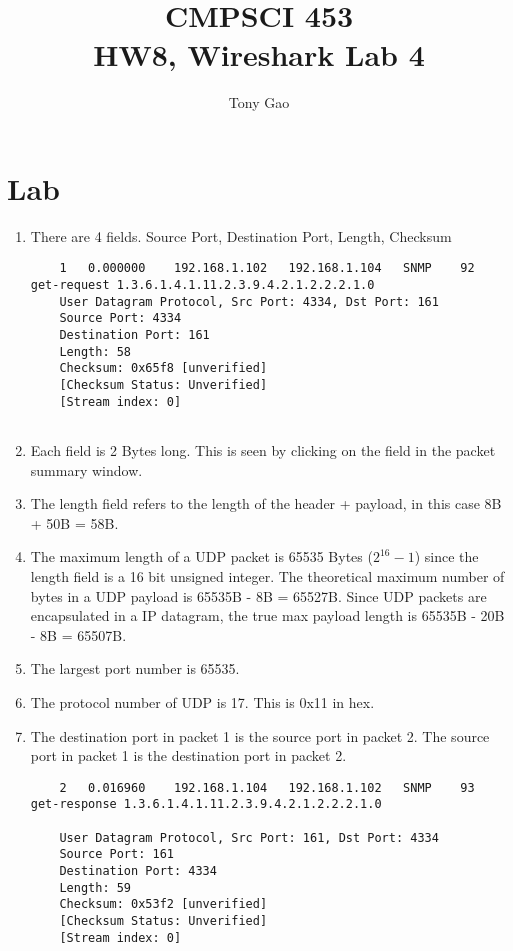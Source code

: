 \documentclass[letter,10pt]{article}
\title{CMPSCI 453\\HW8, Wireshark Lab 4}
\author{Tony Gao}
\begin{document}
\maketitle


\section{Lab}

\begin{enumerate}
	\item There are 4 fields. Source Port, Destination Port, Length, Checksum
	
	\begin{verbatim}
	1	0.000000	192.168.1.102	192.168.1.104	SNMP	92	get-request 1.3.6.1.4.1.11.2.3.9.4.2.1.2.2.2.1.0
	User Datagram Protocol, Src Port: 4334, Dst Port: 161
	Source Port: 4334
	Destination Port: 161
	Length: 58
	Checksum: 0x65f8 [unverified]
	[Checksum Status: Unverified]
	[Stream index: 0]
	
	\end{verbatim}
	
	\item Each field is 2 Bytes long. This is seen by clicking on the field in the packet summary window.
	
	\item The length field refers to the length of the header + payload, in this case 8B + 50B = 58B.
	
	\item The maximum length of a UDP packet is 65535 Bytes ($2^{16}-1$) since the length field is a 16 bit unsigned integer. The theoretical maximum number of bytes in a UDP payload is 65535B - 8B = 65527B. Since UDP packets are  encapsulated in a IP datagram, the true max payload length is 65535B - 20B - 8B = 65507B.
	
	\item The largest port number is 65535.
	
	\item The protocol number of UDP is 17. This is 0x11 in hex.
	
	\item 
	The destination port in packet 1 is the source port in packet 2. The source port in packet 1 is the destination port in packet 2.
	
	\begin{verbatim}
	2	0.016960	192.168.1.104	192.168.1.102	SNMP	93	get-response 1.3.6.1.4.1.11.2.3.9.4.2.1.2.2.2.1.0
	
	User Datagram Protocol, Src Port: 161, Dst Port: 4334
	Source Port: 161
	Destination Port: 4334
	Length: 59
	Checksum: 0x53f2 [unverified]
	[Checksum Status: Unverified]
	[Stream index: 0]
	
	\end{verbatim}
	
	
\end{enumerate}
\end{document}
